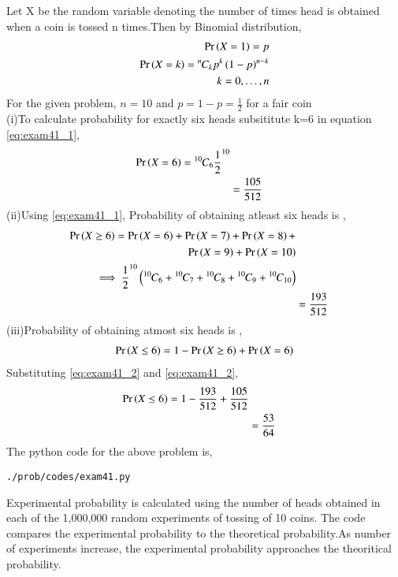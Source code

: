 Let X be the random variable denoting the number of times head is obtained when a coin is tossed n times.Then by Binomial distribution,
\begin{align}
\Pr\left(X = 1\right) = p
\\
\Pr\left(X = k\right) = {{}^{n}\mkern-1muC_{k}} p^k \left(1-p\right)^{n-k}
\\
k = 0,\dots, n
\label{eq:exam41_1}
\end{align}
For the given problem, $n = 10$ and $p = 1-p = \frac{1}{2}$ for a fair coin
\\
(i)To calculate probability for exactly six heads subsititute k=6 in equation \eqref{eq:exam41_1},
\begin{align}
\Pr\left(X = 6\right)= {{}^{10}\mkern-1muC_{6}}\frac{1}{2}^{10}
\\
&= \frac{105}{512}
\label{eq:exam41_2}
\end{align}
(ii)Using \eqref{eq:exam41_1}, Probability of obtaining atleast six heads is ,
\begin{align} 
\Pr\left(X \geq 6\right)=\Pr\left(X=6\right)+\Pr\left(X=7\right)+\Pr\left(X=8\right)+
\\
\Pr\left(X=9\right)+\Pr\left(X=10\right)
\\
\implies \frac{1}{2}^{10}\left({{}^{10}\mkern-1muC_{6}}+{{}^{10}\mkern-1muC_{7}}+{{}^{10}\mkern-1muC_{8}}+{{}^{10}\mkern-1muC_{9}}+{{}^{10}\mkern-1muC_{10}}\right)
\\
&= \frac{193}{512}
\label{eq:exam41_3}
\end{align}
(iii)Probability of obtaining atmost six heads is ,
\begin{align}
\Pr\left(X \leq 6\right)= 1 - \Pr\left(X \geq 6\right) + \Pr\left(X=6\right)
\end{align}
Substituting \eqref{eq:exam41_2} and \eqref{eq:exam41_2}, 
\begin{align}
\Pr\left(X \leq 6\right)= 1 - \frac{193}{512} +  \frac{105}{512} 
\\
&=\frac{53}{64}
\end{align}
The python code for the above problem is,
\begin{lstlisting}
./prob/codes/exam41.py
\end{lstlisting}
Experimental probability is calculated using the number of heads obtained in each of the 1,000,000 random experiments of tossing of 10 coins.
The code compares the experimental probability to the theoretical probability.As number of experiments increase, the experimental probability approaches the theoritical probability.
